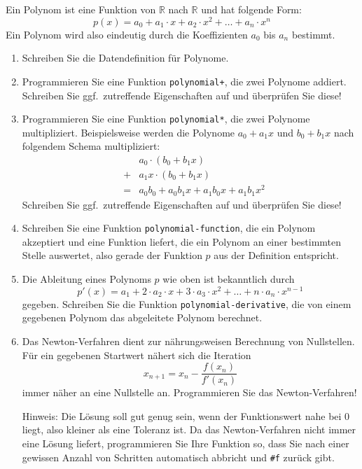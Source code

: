 \begin{aufgabe}
  Ein Polynom ist eine Funktion von $\mathbb{R}$ nach $\mathbb{R}$ und
  hat folgende Form:
  \begin{displaymath}
    p(x) = a_0 +
    a_1 \cdot x + a_2 \cdot x^2 + \ldots + a_n \cdot x^n    
  \end{displaymath}
  Ein Polynom wird also eindeutig durch die Koeffizienten $a_0$ bis
  $a_n$ bestimmt.

  \begin{enumerate}
   \item Schreiben Sie die Datendefinition für Polynome.
   \item Programmieren Sie eine Funktion \texttt{polynomial+}, die
     zwei Polynome addiert.  Schreiben Sie ggf.\ zutreffende Eigenschaften auf
     und überprüfen Sie diese!
     
   \item Programmieren Sie eine Funktion \texttt{polynomial*}, die zwei Polynome 
     multipliziert. 
     Beispielsweise werden die Polynome $a_0+a_1 x$ und $b_0+b_1 x$ nach folgendem Schema multipliziert:
     \begin{eqnarray*}
     & &a_0 \cdot (b_0+b_1x) \\
     &+&a_1 x \cdot (b_0+b_1 x) \\ 
     &=&a_0b_0+a_0b_1 x + a_1b_0x + a_1b_1x^2
     \end{eqnarray*}	
     Schreiben Sie ggf.\ zutreffende Eigenschaften auf und überprüfen Sie diese!
   \item Schreiben Sie eine Funktion \texttt{polynomial-function}, die
     ein Polynom akzeptiert und eine Funktion liefert, die ein Polynom
     an einer bestimmten Stelle auswertet, also gerade der Funktion
     $p$ aus der Definition entspricht. 
   \item Die Ableitung eines Polynoms $p$ wie oben ist bekanntlich durch
     \begin{displaymath}
       p'(x) = a_1 + 2\cdot a_2 \cdot x + 3\cdot a_3\cdot x^2 + \ldots
       + n \cdot a_n \cdot x^{n-1}
     \end{displaymath}
     gegeben. Schreiben Sie die Funktion
     \texttt{polynomial-derivative}, die von einem gegebenen Polynom das abgeleitete Polynom
     berechnet.
   \item Das Newton-Verfahren dient zur nährungsweisen
     Berechnung von Nullstellen. Für ein gegebenen Startwert nähert sich die
     Iteration 
     \begin{displaymath}
       x_{n+1} = x_n - \frac{f(x_n)}{f'(x_n)}
     \end{displaymath}
     immer näher an eine Nullstelle an.
     Programmieren Sie das Newton-Verfahren!

     Hinweis: Die Lösung soll gut genug sein, wenn der Funktionswert nahe
     bei 0 liegt, also kleiner als eine Toleranz ist. 
     Da das
     Newton-Verfahren nicht immer eine Lösung liefert, programmieren
     Sie Ihre Funktion so, dass Sie nach einer gewissen Anzahl von Schritten
     automatisch abbricht und \verb|#f| zurück gibt.
 \end{enumerate}
\end{aufgabe}

